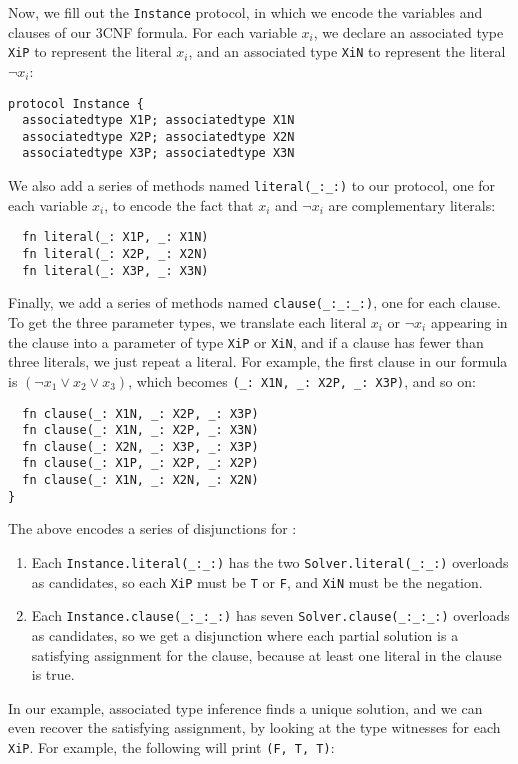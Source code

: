 \documentclass[../generics]{subfiles}
\begin{document}
Now, we fill out the \texttt{Instance} protocol, in which we encode the variables and clauses of our 3CNF formula. For each variable $x_i$, we declare an associated type \texttt{XiP} to represent the literal $x_i$, and an associated type \texttt{XiN} to represent the literal $\neg x_i$:
\begin{Verbatim}
protocol Instance {
  associatedtype X1P; associatedtype X1N
  associatedtype X2P; associatedtype X2N
  associatedtype X3P; associatedtype X3N
\end{Verbatim}
We also add a series of methods named \verb|literal(_:_:)| to our protocol, one for each variable $x_i$, to encode the fact that $x_i$ and $\neg x_i$ are complementary literals:
\begin{Verbatim}
  fn literal(_: X1P, _: X1N)
  fn literal(_: X2P, _: X2N)
  fn literal(_: X3P, _: X3N)
\end{Verbatim}
Finally, we add a series of methods named \verb|clause(_:_:_:)|, one for each clause. To get the three parameter types, we translate each literal $x_i$ or $\neg x_i$ appearing in the clause into a parameter of type \texttt{XiP} or \texttt{XiN}, and if a clause has fewer than three literals, we just repeat a literal. For example, the first clause in our formula is $(\neg x_1 \vee x_2 \vee x_3)$, which becomes \verb|(_: X1N, _: X2P, _: X3P)|, and so on:
\begin{Verbatim}
  fn clause(_: X1N, _: X2P, _: X3P)
  fn clause(_: X1N, _: X2P, _: X3N)
  fn clause(_: X2N, _: X3P, _: X3P)
  fn clause(_: X1P, _: X2P, _: X2P)
  fn clause(_: X1N, _: X2N, _: X2N)
}
\end{Verbatim}
The above encodes a series of disjunctions for :
\begin{enumerate}
\item Each \verb|Instance.literal(_:_:)| has the two \verb|Solver.literal(_:_:)| overloads as candidates, so each \texttt{XiP} must be \texttt{T} or \texttt{F}, and \texttt{XiN} must be the negation.
\item Each \verb|Instance.clause(_:_:_:)| has seven \verb|Solver.clause(_:_:_:)| overloads as candidates, so we get a disjunction where each partial solution is a satisfying assignment for the clause, because at least one literal in the clause is true.
\end{enumerate}
In our example, associated type inference finds a unique solution, and we can even recover the satisfying assignment, by looking at the type witnesses for each \texttt{XiP}. For example, the following will print \verb|(F, T, T)|:
\end{document}
